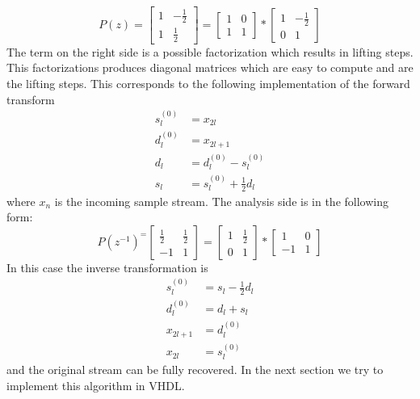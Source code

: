 \begin{refsection}
\begin{equation*}
P(z) =
\begin{bmatrix}
1 & -\frac{1}{2} \\
1 & \frac{1}{2}
\end{bmatrix}
 = 
 \begin{bmatrix}
 1 & 0 \\
 1 & 1
 \end{bmatrix}
 *
 \begin{bmatrix}
 1 & -\frac{1}{2} \\
 0 & 1
 \end{bmatrix}
\end{equation*}
The term on the right side is a possible factorization which results in lifting steps. This factorizations produces diagonal matrices which are easy to compute and are the lifting steps.
This corresponds to the following implementation of the forward transform \cite{fpga:Daubechies1998}
\begin{equation}
	\begin{aligned}
	s_l^{(0)} &= x_{2l} \\
	d_l^{(0)} &= x_{2l+1} \\ 
	d_l &= d_l^{(0)} - s_l^{(0)} \\
	s_l &= s_l^{(0)} + \frac{1}{2}d_l
	\end{aligned}
\end{equation}
where $x_{n}$ is the incoming sample stream.
The analysis side is in the following form:
\begin{equation*}
P(z^{-1})^ =
\begin{bmatrix}
\frac{1}{2} & \frac{1}{2} \\
-1 & 1
\end{bmatrix}
= 
\begin{bmatrix}
1 & \frac{1}{2} \\
0 & 1
\end{bmatrix}
*
\begin{bmatrix}
1 & 0 \\
-1 & 1
\end{bmatrix}
\end{equation*}
In this case the inverse transformation is 
\begin{equation}
\begin{aligned}
s_l^{(0)} &= s_l - \frac{1}{2}d_l \\
d_l^{(0)} &= d_l + s_l \\ 
x_{2l+1}& =d_l^{(0)} \\
x_{2l} &= s_l^{(0)}
\end{aligned}
\end{equation}
and the original stream can be fully recovered.
In the next section we try to implement this algorithm in VHDL.


\end{refsection}
